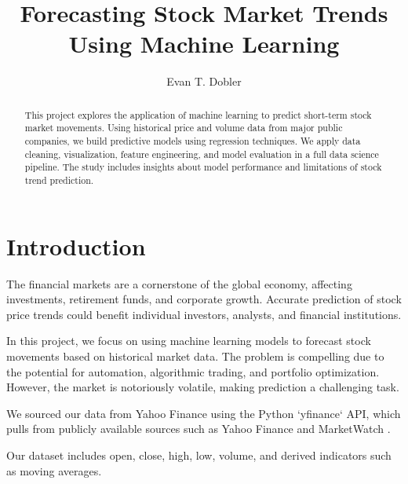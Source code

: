\documentclass[runningheads]{llncs}
\begin{document}
\title{Forecasting Stock Market Trends Using Machine Learning}

\author{Evan T. Dobler}



\maketitle

\begin{abstract}
This project explores the application of machine learning to predict short-term stock market movements. Using historical price and volume data from major public companies, we build predictive models using regression techniques. We apply data cleaning, visualization, feature engineering, and model evaluation in a full data science pipeline. The study includes insights about model performance and limitations of stock trend prediction.
\end{abstract}

\section{Introduction}
The financial markets are a cornerstone of the global economy, affecting investments, retirement funds, and corporate growth. Accurate prediction of stock price trends could benefit individual investors, analysts, and financial institutions. 

In this project, we focus on using machine learning models to forecast stock movements based on historical market data. The problem is compelling due to the potential for automation, algorithmic trading, and portfolio optimization. However, the market is notoriously volatile, making prediction a challenging task. 

We sourced our data from Yahoo Finance using the Python `yfinance` API, which pulls from publicly available sources such as Yahoo Finance \cite{yahoo-finance} and MarketWatch \cite{marketwatch}.

Our dataset includes open, close, high, low, volume, and derived indicators such as moving averages.
\end{document}
